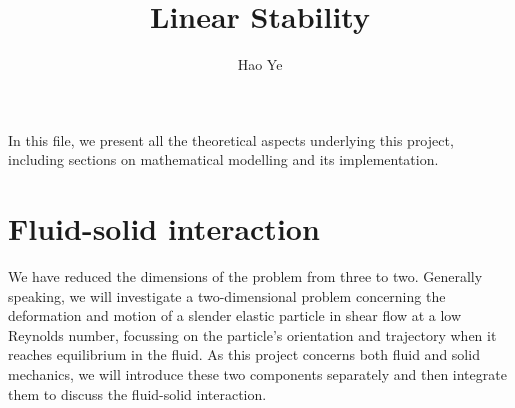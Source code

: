 \documentclass[a4paper,12pt]{article}
\title{Linear Stability}
\author{Hao Ye} %
\begin{document}
\maketitle

In this file, we present all the theoretical aspects underlying this project, including sections on mathematical modelling and its implementation.

\section{Fluid-solid interaction}
We have reduced the dimensions of the problem from three to two. Generally speaking, we will investigate a two-dimensional problem concerning the deformation and motion of a slender elastic particle in shear flow at a low Reynolds number, focussing on the particle's orientation and trajectory when it reaches equilibrium in the fluid. As this project concerns both fluid and solid mechanics, we will introduce these two components separately and then integrate them to discuss the fluid-solid interaction.
\end{document}
